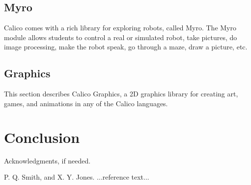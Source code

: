\documentclass[preprint]{sigplanconf}
\begin{document}
\subsection{Myro}

Calico comes with a rich library for exploring robots, called
Myro. The Myro module allows students to control a real or simulated
robot, take pictures, do image processing, make the robot speak, go
through a maze, draw a picture, etc.

\subsection{Graphics}

This section describes Calico Graphics, a 2D graphics library for
creating art, games, and animations in any of the Calico languages.

\section{Conclusion}



\acks

Acknowledgments, if needed.





\begin{thebibliography}{}
\softraggedright

P. Q. Smith, and X. Y. Jones. ...reference text...




\end{thebibliography}
\end{document}
